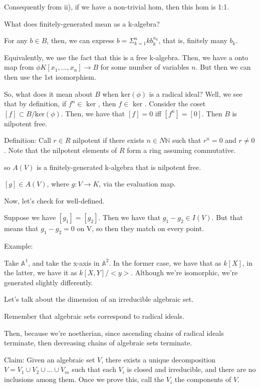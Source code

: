 \documentclass[10pt]{article}
\begin{document}
Consequently from ii), if we have a non-trivial hom, then this hom is 1:1.

What does finitely-generated mean as a k-algebra? 

For any $b \in B$, then, we can express $b = \Sigma_{k=1}^n k b_k^{n_k}$, that is, finitely many $b_k$. 

Equivalently, we use the fact that this is a free k-algebra. Then, we have a onto map from $\phi K[x_1,...,x_n] \rightarrow B$ for some number of variables $n$. But then we can then use the 1st isomorphism. 

So, what does it mean about $B$ when $\text{ker}(\phi)$ is a radical ideal? Well, we see that by definition, if $f^n \in \text{ ker }$, then $f \in \text{ ker }$. Consider the coset $[f] \subset B / \text{ker}(\phi)$. Then, we have that $[f] = 0$ iff $[f^n] = [0]$. Then $B$ is nilpotent free.

Definition: Call $r \in R$ nilpotent if there exists $n \in N\mathbb{N}$ such that $r^n = 0$ and $r \not = 0$. Note that the nilpotent elements of $R$ form a ring assuming commutative.

so $A(V)$ is a finitely-generated k-algebra that is nilpotent free.

$[g] \in A(V)$, where $g: V \rightarrow K$, via the evaluation map.

Now, let’s check for well-defined. 

Suppose we have $[g_1] = [g_2]$. Then we have that $g_1 - g_2 \in I(V)$. But that means that $g_1 - g_2  = 0$ on V, so then they match on every point. 

Example:

Take $\mathbb{A}^1$, and take the x-axis in $\mathbb{A}^2$. In the former case, we have that as $k[X]$, in the latter, we have it as $k[X,Y]/<y>$. Although we’re isomorphic, we’re generated slightly differently.

Let’s talk about the dimension of an irreducible algebraic set.

Remember that algebraic sets correspond to radical ideals.

Then, because we’re noetherian, since ascending chains of radical ideals terminate, then decreasing chains of algebraic sets terminate.

Claim: Given an algebraic set $V$, there exists a unique decomposition $V = V_1 \cup V_2 \cup ... \cup V_m$ such that each $V_i$ is closed and irreducible, and there are no inclusions among them. Once we prove this, call the $V_i$ the components of $V$.
\end{document}
